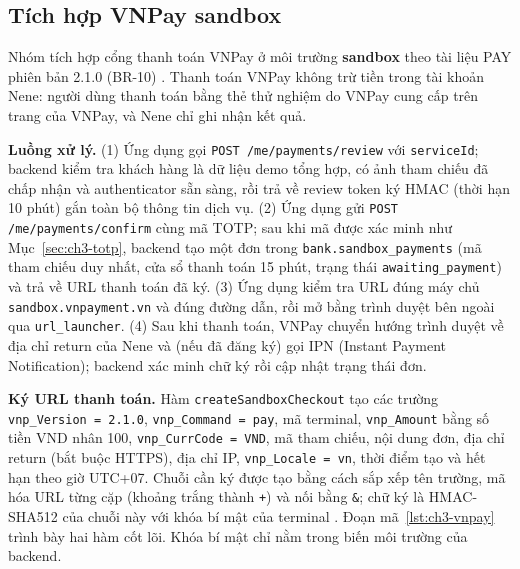 \subsection{Tích hợp VNPay sandbox}
\label{sec:ch3-vnpay}

Nhóm tích hợp cổng thanh toán VNPay ở môi trường \textbf{sandbox} theo tài liệu PAY phiên bản 2.1.0 (BR-10) \parencite{ch2-vnpay-pay}. Thanh toán VNPay không trừ tiền trong tài khoản Nene: người dùng thanh toán bằng thẻ thử nghiệm do VNPay cung cấp trên trang của VNPay, và Nene chỉ ghi nhận kết quả.

\textbf{Luồng xử lý.} (1) Ứng dụng gọi \texttt{POST /\allowbreak{}me/\allowbreak{}payments/\allowbreak{}review} với \texttt{serviceId}; backend kiểm tra khách hàng là dữ liệu demo tổng hợp, có ảnh tham chiếu đã chấp nhận và authenticator sẵn sàng, rồi trả về review token ký HMAC (thời hạn 10 phút) gắn toàn bộ thông tin dịch vụ. (2) Ứng dụng gửi \texttt{POST /\allowbreak{}me/\allowbreak{}payments/\allowbreak{}confirm} cùng mã TOTP; sau khi mã được xác minh như Mục~\ref{sec:ch3-totp}, backend tạo một đơn trong \texttt{bank.\allowbreak{}sandbox\_\allowbreak{}payments} (mã tham chiếu duy nhất, cửa sổ thanh toán 15 phút, trạng thái \texttt{awaiting\_\allowbreak{}payment}) và trả về URL thanh toán đã ký. (3) Ứng dụng kiểm tra URL đúng máy chủ \texttt{sandbox.\allowbreak{}vnpayment.\allowbreak{}vn} và đúng đường dẫn, rồi mở bằng trình duyệt bên ngoài qua \texttt{url\_\allowbreak{}launcher}. (4) Sau khi thanh toán, VNPay chuyển hướng trình duyệt về địa chỉ return của Nene và (nếu đã đăng ký) gọi IPN (Instant Payment Notification); backend xác minh chữ ký rồi cập nhật trạng thái đơn.

\textbf{Ký URL thanh toán.} Hàm \texttt{create\allowbreak{}Sandbox\allowbreak{}Checkout} tạo các trường \texttt{vnp\_\allowbreak{}Version = 2.1.0}, \texttt{vnp\_\allowbreak{}Command = pay}, mã terminal, \texttt{vnp\_\allowbreak{}Amount} bằng số tiền VND nhân 100, \texttt{vnp\_\allowbreak{}CurrCode = VND}, mã tham chiếu, nội dung đơn, địa chỉ return (bắt buộc HTTPS), địa chỉ IP, \texttt{vnp\_\allowbreak{}Locale = vn}, thời điểm tạo và hết hạn theo giờ UTC+07. Chuỗi cần ký được tạo bằng cách sắp xếp tên trường, mã hóa URL từng cặp (khoảng trắng thành \texttt{+}) và nối bằng \texttt{\&}; chữ ký là HMAC-SHA512 của chuỗi này với khóa bí mật của terminal \parencite{ch3-vnpay-hash}. Đoạn mã~\ref{lst:ch3-vnpay} trình bày hai hàm cốt lõi. Khóa bí mật chỉ nằm trong biến môi trường của backend.

